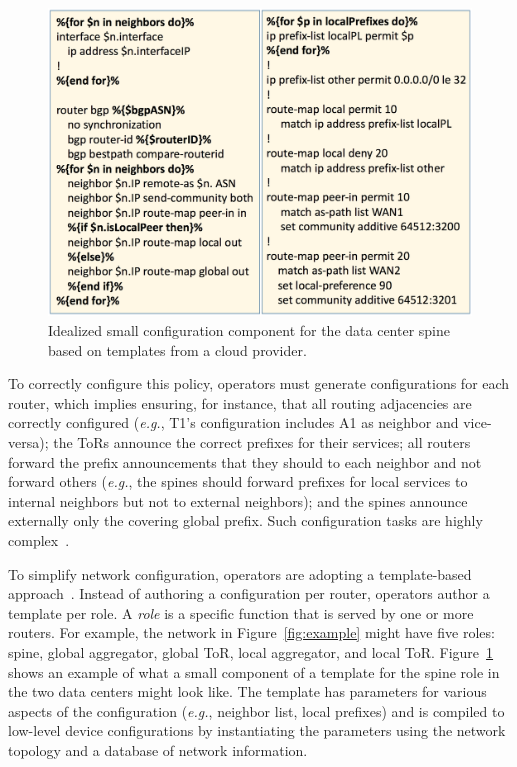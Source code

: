 \documentclass[numbers, 10pt, preprint]{sigplanconf}
\newcommand{\EG}{\emph{e.g.}}
\begin{document}
\begin{figure}[t!]
  \centering
  \includegraphics[width=\columnwidth]{figures/templates}
  \caption{Idealized small configuration component for the data center spine based on templates from a cloud provider.}
  \label{fig:templates}
  \vspace{-.8em}
\end{figure}


To correctly configure this policy, operators must generate configurations for each router, which implies ensuring, for instance, that all routing adjacencies are correctly configured (\EG, T1's configuration includes A1 as neighbor and vice-versa); the ToRs announce the correct prefixes for their services; all routers  forward the prefix announcements that they should to each neighbor and not forward others (\EG, the spines should forward prefixes for local services to internal neighbors but not to external neighbors); and the spines announce externally only the covering global prefix. Such configuration tasks are highly complex~\cite{juniper-study,bgpmon,batfish,propane}.

To simplify network configuration, operators are adopting a template-based approach~\cite{hatch,thwack}. Instead of authoring a configuration per router, operators author a template per role.
%
A {\em role} is a specific function that is served by one or more routers.
%
For example, the network in Figure~\ref{fig:example} might have five roles: spine, global aggregator, global ToR, local aggregator, and local ToR.
%
Figure~\ref{fig:templates} shows an example of what a small component of a template for the spine role in the two data centers might look like. The template has parameters for various aspects of the configuration (\EG, neighbor list, local prefixes) and is compiled to low-level device configurations by instantiating the parameters using the network topology and a database of network information.
\end{document}
